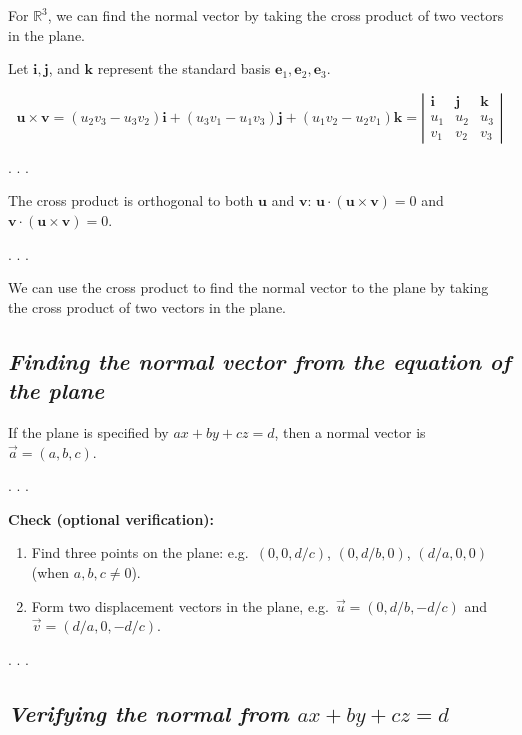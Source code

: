 \documentclass[
  letterpaper,
  DIV=11,
  numbers=noendperiod]{scrartcl}
\providecommand{\tightlist}{%
  \setlength{\itemsep}{0pt}\setlength{\parskip}{0pt}}\usepackage{longtable,booktabs,array}
\begin{document}
For \(\mathbb{R}^3\), we can find the normal vector by taking the cross
product of two vectors in the plane.

Let \(\mathbf{i}, \mathbf{j}\), and \(\mathbf{k}\) represent the
standard basis \(\mathbf{e}_{1}, \mathbf{e}_{2}, \mathbf{e}_{3}\).

\[
\mathbf{u} \times \mathbf{v}=\left(u_{2} v_{3}-u_{3} v_{2}\right) \mathbf{i}+\left(u_{3} v_{1}-u_{1} v_{3}\right) \mathbf{j}+\left(u_{1} v_{2}-u_{2} v_{1}\right) \mathbf{k}=\left|\begin{array}{ccc}
\mathbf{i} & \mathbf{j} & \mathbf{k} \\
u_{1} & u_{2} & u_{3} \\
v_{1} & v_{2} & v_{3}
\end{array}\right|
\]

. . .

The cross product is orthogonal to both \(\mathbf{u}\) and
\(\mathbf{v}\): \(\mathbf{u} \cdot (\mathbf{u} \times \mathbf{v})=0\)
and \(\mathbf{v} \cdot (\mathbf{u} \times \mathbf{v})=0\).

. . .

We can use the cross product to find the normal vector to the plane by
taking the cross product of two vectors in the plane.

\subsection{\texorpdfstring{\emph{Finding the normal vector from the
equation of the
plane}}{Finding the normal vector from the equation of the plane}}\label{finding-the-normal-vector-from-the-equation-of-the-plane}

If the plane is specified by \(ax + by + cz = d\), then a normal vector
is \(\vec a = (a, b, c)\).

. . .

\textbf{Check (optional verification):}

\begin{enumerate}
\def\labelenumi{\arabic{enumi}.}
\tightlist
\item
  Find three points on the plane: e.g.~\((0, 0, d/c)\), \((0, d/b, 0)\),
  \((d/a, 0, 0)\) (when \(a,b,c \neq 0\)).
\item
  Form two displacement vectors in the plane,
  e.g.~\(\vec u = (0, d/b, -d/c)\) and \(\vec v = (d/a, 0, -d/c)\).
\end{enumerate}

. . .

\subsection{\texorpdfstring{\emph{Verifying the normal from
\(ax+by+cz=d\)}}{Verifying the normal from ax+by+cz=d}}\label{verifying-the-normal-from-axbyczd}
\end{document}
